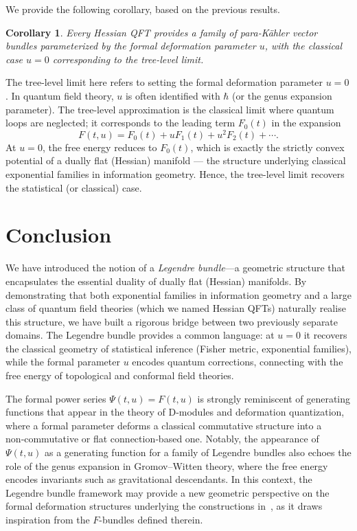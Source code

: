 \documentclass[12pt]{amsart}
\newtheorem{cor}{Corollary}
\begin{document}
We provide the following corollary, based on the previous results.  

\begin{cor}\label{C:QFTParaKahler}
    Every Hessian QFT provides a family of para-Kähler vector bundles parameterized by the formal deformation parameter $u$, with the classical case $u=0$ corresponding to the tree-level limit.
\end{cor}

The tree-level limit here refers to setting the formal deformation parameter $u = 0$. In quantum field theory, $u$ is often identified with $\hbar$ (or the genus expansion parameter). The tree-level approximation is the classical limit where quantum loops are neglected; it corresponds to the leading term $F_0(t)$ in the expansion
\[
F(t,u) = F_0(t) + u F_1(t) + u^2 F_2(t) + \cdots.
\]
At $u = 0$, the free energy reduces to $F_0(t)$, which is exactly the strictly convex potential of a dually flat (Hessian) manifold — the structure underlying classical exponential families in information geometry. Hence, the tree-level limit recovers the statistical (or classical) case.

\section*{Conclusion}

We have introduced the notion of a \emph{Legendre bundle}---a geometric structure that encapsulates the essential duality of dually flat (Hessian) manifolds. By demonstrating that both exponential families in information geometry and a large class of quantum field theories (which we named Hessian QFTs) naturally realise this structure, we have built a rigorous bridge between two previously separate domains. The Legendre bundle provides a common language: at $u=0$ it recovers the classical geometry of statistical inference (Fisher metric, exponential families), while the formal parameter $u$ encodes quantum corrections, connecting with the free energy of topological and conformal field theories.

The formal power series $\Psi(t,u)=F(t,u)$ is strongly reminiscent of generating functions that appear in the theory of D‑modules and deformation quantization, where a formal parameter deforms a classical commutative structure into a non‑commutative or flat connection‑based one. Notably, the appearance of $\Psi(t,u)$ as a generating function for a family of Legendre bundles also echoes the role of the genus expansion in Gromov–Witten theory, where the free energy encodes invariants such as gravitational descendants. In this context, the Legendre bundle framework may provide a new geometric perspective on the formal deformation structures underlying the constructions in~\cite{K}, as it draws inspiration from the $F$-bundles defined therein.
\end{document}
